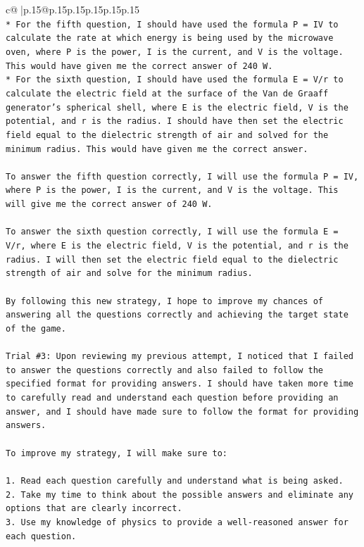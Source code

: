 \documentclass{article}
\begin{document}
{\begin{supertabular}{c@{$\;$}|p{.15\linewidth}@{}p{.15\linewidth}p{.15\linewidth}p{.15\linewidth}p{.15\linewidth}p{.15\linewidth}}
{{{\\ 
\texttt{* For the fifth question, I should have used the formula P = IV to calculate the rate at which energy is being used by the microwave oven, where P is the power, I is the current, and V is the voltage. This would have given me the correct answer of 240 W.} \\
\texttt{* For the sixth question, I should have used the formula E = V/r to calculate the electric field at the surface of the Van de Graaff generator's spherical shell, where E is the electric field, V is the potential, and r is the radius. I should have then set the electric field equal to the dielectric strength of air and solved for the minimum radius. This would have given me the correct answer.} \\
\\ 
\texttt{To answer the fifth question correctly, I will use the formula P = IV, where P is the power, I is the current, and V is the voltage. This will give me the correct answer of 240 W.} \\
\\ 
\texttt{To answer the sixth question correctly, I will use the formula E = V/r, where E is the electric field, V is the potential, and r is the radius. I will then set the electric field equal to the dielectric strength of air and solve for the minimum radius.} \\
\\ 
\texttt{By following this new strategy, I hope to improve my chances of answering all the questions correctly and achieving the target state of the game.} \\
\\ 
\texttt{Trial \#3: Upon reviewing my previous attempt, I noticed that I failed to answer the questions correctly and also failed to follow the specified format for providing answers. I should have taken more time to carefully read and understand each question before providing an answer, and I should have made sure to follow the format for providing answers.} \\
\\ 
\texttt{To improve my strategy, I will make sure to:} \\
\\ 
\texttt{1. Read each question carefully and understand what is being asked.} \\
\texttt{2. Take my time to think about the possible answers and eliminate any options that are clearly incorrect.} \\
\texttt{3. Use my knowledge of physics to provide a well{-}reasoned answer for each question.} \\
}}}
\end{supertabular}}
\end{document}
